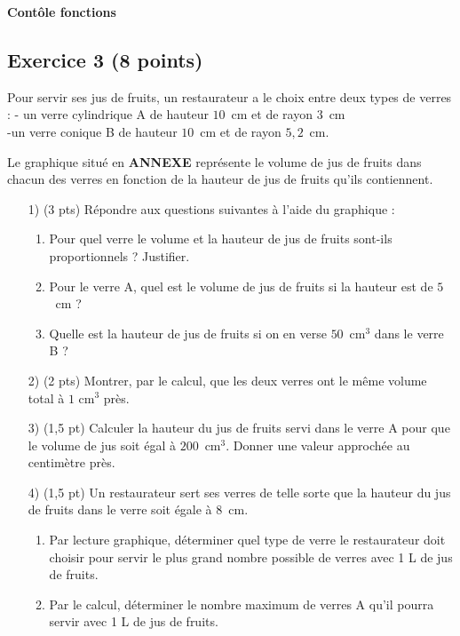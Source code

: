 \documentclass[14 pt, fleqn, pstricks]{extarticle}
\theoremstyle{plain}
\begin{document}
\begin{center} {\Large \textbf{Contôle fonctions}}
\subsection*{Exercice 3 (8 points) }\end{center}


Pour servir ses jus de fruits, un restaurateur a le choix entre deux types de verres :  - un verre cylindrique A de hauteur $10$~cm et de rayon $3$~cm\\ -un verre conique B de hauteur $10$~cm et de rayon $5,2$~cm.


Le graphique situé en \textbf{ANNEXE} représente le volume de jus de fruits dans chacun des verres en fonction de la hauteur de jus de fruits qu'ils contiennent.


\begin{enumerate}
\item[1)] (3 pts) Répondre aux questions suivantes à l'aide du graphique :
	\begin{enumerate}
		\item Pour quel verre le volume et la hauteur de jus de fruits sont-ils proportionnels ? Justifier.
		\item Pour le verre A, quel est le volume de jus de fruits si la hauteur est de $5$~cm ?
		\item Quelle est la hauteur de jus de fruits si on en verse $50$~cm$^3$ dans le verre B ?
 	\end{enumerate}
\item[2)] (2 pts)  Montrer, par le calcul, que les deux verres ont le même volume total à $1$ cm$^3$ près.
\item[3)] (1,5 pt) Calculer la hauteur du jus de fruits servi dans le verre A pour que le volume de jus soit égal à $200$~cm$^3$. Donner une valeur approchée au centimètre près.
\item[4)] (1,5 pt)  Un restaurateur sert ses verres de telle sorte que la hauteur du jus de fruits dans le verre soit égale à $8$~cm.
	\begin{enumerate}
		\item Par lecture graphique, déterminer quel type de verre le restaurateur doit choisir pour servir le plus grand nombre possible de verres avec 1 L de jus de fruits.
		\item Par le calcul, déterminer le nombre maximum de verres A qu'il pourra servir avec 1 L de jus de fruits.
	\end{enumerate}
\end{enumerate}
\end{document}
